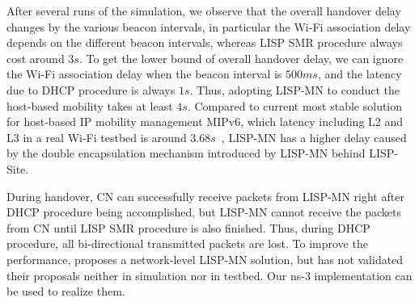 After several runs  of the simulation, we observe
that the overall handover delay changes by the various beacon intervals, in particular the Wi-Fi
association delay depends on the different beacon intervals, whereas LISP SMR
procedure always cost around $3s$. To get the lower bound of overall handover
delay, we can ignore the Wi-Fi association delay when the beacon interval is
$500ms$, and the latency due to DHCP procedure is always $1s$. Thus, adopting
LISP-MN to conduct the host-based mobility takes at least $4s$. Compared to
current most stable solution for host-based IP mobility management MIPv6, which
latency including L2 and L3 in a real Wi-Fi testbed is around
$3.68s$~\cite{vassiliou2010analysis}, LISP-MN has a higher delay caused by the
double encapsulation mechanism introduced by LISP-MN behind LISP-Site.

During handover, CN can successfully receive packets from LISP-MN right after
DHCP procedure being accomplished, but LISP-MN cannot receive the packets from
CN until LISP SMR procedure is also finished. Thus, during DHCP procedure, all
bi-directional transmitted packets are lost. To improve the performance,
\cite{tang2017lisp} proposes a network-level LISP-MN solution, but has not
validated their proposals neither in simulation nor in testbed. Our ns-3
implementation can be used to realize them.

